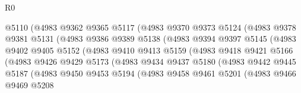\begin{lexlean}{R0}
\begin{coremodule}
                          @5110
                          (@4983
                            @9362
                            @9365
                            @5117
                            (@4983
                              @9370
                              @9373
                              @5124
                              (@4983
                                @9378
                                @9381
                                @5131
                                (@4983
                                  @9386
                                  @9389
                                  @5138
                                  (@4983
                                    @9394
                                    @9397
                                    @5145
                                    (@4983
                                      @9402
                                      @9405
                                      @5152
                                      (@4983
                                        @9410
                                        @9413
                                        @5159
                                        (@4983
                                          @9418
                                          @9421
                                          @5166
                                          (@4983
                                            @9426
                                            @9429
                                            @5173
                                            (@4983
                                              @9434
                                              @9437
                                              @5180
                                              (@4983
                                                @9442
                                                @9445
                                                @5187
                                                (@4983
                                                  @9450
                                                  @9453
                                                  @5194
                                                  (@4983
                                                    @9458
                                                    @9461
                                                    @5201
                                                    (@4983
                                                      @9466
                                                      @9469
                                                      @5208

\end{coremodule}
\end{lexlean}
